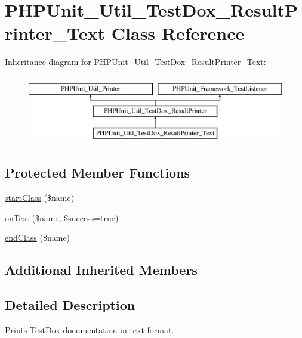 \hypertarget{class_p_h_p_unit___util___test_dox___result_printer___text}{}\section{P\+H\+P\+Unit\+\_\+\+Util\+\_\+\+Test\+Dox\+\_\+\+Result\+Printer\+\_\+\+Text Class Reference}
\label{class_p_h_p_unit___util___test_dox___result_printer___text}
Inheritance diagram for P\+H\+P\+Unit\+\_\+\+Util\+\_\+\+Test\+Dox\+\_\+\+Result\+Printer\+\_\+\+Text\+:\begin{figure}[H]
\begin{center}
\leavevmode
\includegraphics[height=3.000000cm]{class_p_h_p_unit___util___test_dox___result_printer___text}
\end{center}
\end{figure}
\subsection*{Protected Member Functions}
\begin{DoxyCompactItemize}
\item 
\mbox{\hyperlink{class_p_h_p_unit___util___test_dox___result_printer___text_a646956a1369c611cc5cad829c44ac03f}{start\+Class}} (\$name)
\item 
\mbox{\hyperlink{class_p_h_p_unit___util___test_dox___result_printer___text_a723ae879488ca3d36ebf29c09a4e01dc}{on\+Test}} (\$name, \$success=true)
\item 
\mbox{\hyperlink{class_p_h_p_unit___util___test_dox___result_printer___text_aa11acea793bf8d2730e17dc210be5d3d}{end\+Class}} (\$name)
\end{DoxyCompactItemize}
\subsection*{Additional Inherited Members}


\subsection{Detailed Description}
Prints Test\+Dox documentation in text format. 

